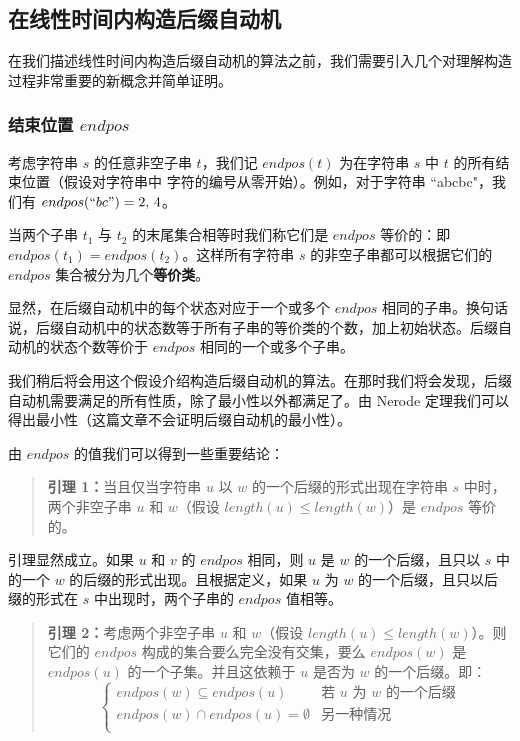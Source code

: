 \subsection{在线性时间内构造后缀自动机}

在我们描述线性时间内构造后缀自动机的算法之前，我们需要引入几个对理解构造过程非常重要的新概念并简单证明。

\subsubsection{结束位置 $endpos$}

考虑字符串  $s$ 的任意非空子串 $t$，我们记 $endpos(t)$ 为在字符串 $s$ 中 $t$ 的所有结束位置（假设对字符串中
字符的编号从零开始）。例如，对于字符串 ``abcbc"，我们有 $endpos(``bc")=2,\,4$。

当两个子串 \(t_1\) 与 \(t_2\) 的末尾集合相等时我们称它们是 \(endpos\)
等价的：即 \(endpos(t_1)=endpos(t_2)\)。这样所有字符串 \(s\)
的非空子串都可以根据它们的 \textbf{\(endpos\)}
集合被分为几个\textbf{等价类}。

显然，在后缀自动机中的每个状态对应于一个或多个 \(endpos\)
相同的子串。换句话说，后缀自动机中的状态数等于所有子串的等价类的个数，加上初始状态。后缀自动机的状态个数等价于
\(endpos\) 相同的一个或多个子串。

我们稍后将会用这个假设介绍构造后缀自动机的算法。在那时我们将会发现，后缀自动机需要满足的所有性质，除了最小性以外都满足了。由 Nerode 定理我们可以得出最小性（这篇文章不会证明后缀自动机的最小性）。

由 \(endpos\) 的值我们可以得到一些重要结论：

\begin{quote}
\textbf{引理 1：}当且仅当字符串 \(u\) 以 \(w\)
的一个后缀的形式出现在字符串 \(s\) 中时，两个非空子串 \(u\) 和
\(w\)（假设 \(length(u)\le length(w)\)）是 \(endpos\) 等价的。
\end{quote}

引理显然成立。如果 \(u\) 和 \(v\) 的 \(endpos\) 相同，则 \(u\) 是 \(w\)
的一个后缀，且只以 \(s\) 中的一个 \(w\)
的后缀的形式出现。且根据定义，如果 \(u\) 为 \(w\)
的一个后缀，且只以后缀的形式在 \(s\) 中出现时，两个子串的 \(endpos\)
值相等。

\begin{quote}
\textbf{引理 2：}考虑两个非空子串 \(u\) 和 \(w\)（假设
\(length(u)\le length(w)\)）。则它们的 \(endpos\)
构成的集合要么完全没有交集，要么 \(endpos(w)\) 是 \(endpos(u)\)
的一个子集。并且这依赖于 \(u\) 是否为 \(w\) 的一个后缀。即：
\begin{equation*}
\begin{cases}
 endpos(w)\subseteq endpos(u)&\text{若 $u$ 为 $w$ 的一个后缀}\\
 endpos(w)\cap endpos(u)=\emptyset&\text{另一种情况}\\
\end{cases}
\end{equation*}
\end{quote}

